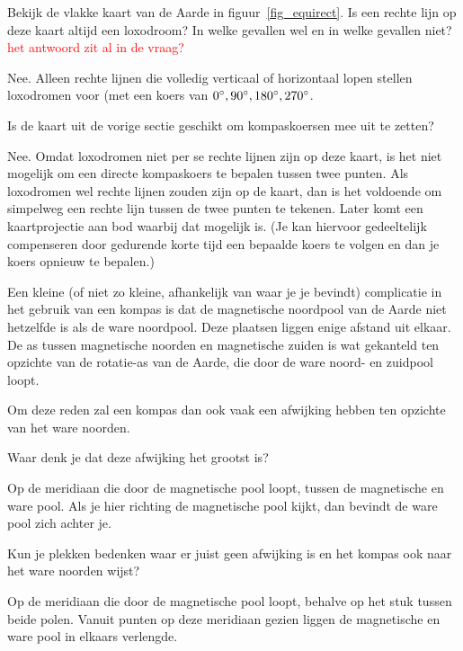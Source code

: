 \begin{opgave}[\ster]
	\begin{subopgave}
		Bekijk de vlakke kaart van de Aarde in figuur~\ref{fig_equirect}. Is een rechte lijn op deze kaart altijd een loxodroom? In welke gevallen wel en in welke gevallen niet? \textcolor{red}{het antwoord zit al in de vraag?}
		\begin{antwoord}
			Nee. Alleen rechte lijnen die volledig verticaal of horizontaal lopen stellen loxodromen voor (met een koers van $0\degree, 90\degree, 180\degree, 270\degree$. 
		\end{antwoord}
	\end{subopgave}
	\begin{subopgave}
		Is de kaart uit de vorige sectie geschikt om kompaskoersen mee uit te zetten?
		\begin{antwoord}
			Nee. Omdat loxodromen niet per se rechte lijnen zijn op deze kaart, is het niet mogelijk om een directe kompaskoers te bepalen tussen twee punten. Als loxodromen wel rechte lijnen zouden zijn op de kaart, dan is het voldoende om simpelweg een rechte lijn tussen de twee punten te tekenen. Later komt een kaartprojectie aan bod waarbij dat mogelijk is. (Je kan hiervoor gedeeltelijk compenseren door gedurende korte tijd een bepaalde koers te volgen en dan je koers opnieuw te bepalen.)
		\end{antwoord}
	\end{subopgave}
\end{opgave}
	
Een kleine (of niet zo kleine, afhankelijk van waar je je bevindt) complicatie in het gebruik van een kompas is dat de magnetische noordpool van de Aarde niet hetzelfde is als de ware noordpool. Deze plaatsen liggen enige afstand uit elkaar. De as tussen magnetische noorden en magnetische zuiden is wat gekanteld ten opzichte van de rotatie-as van de Aarde, die door de ware noord- en zuidpool loopt.

Om deze reden zal een kompas dan ook vaak een afwijking hebben ten opzichte van het ware noorden.

\begin{opgave}
	\begin{subopgave}
		Waar denk je dat deze afwijking het grootst is?
		\begin{antwoord}
			Op de meridiaan die door de magnetische pool loopt, tussen de magnetische en ware pool. Als je hier richting de magnetische pool kijkt, dan bevindt de ware pool zich achter je.
		\end{antwoord}
	\end{subopgave}
	\begin{subopgave}
		Kun je plekken bedenken waar er juist geen afwijking is en het kompas ook naar het ware noorden wijst?
		\begin{antwoord}
			Op de meridiaan die door de magnetische pool loopt, behalve op het stuk tussen beide polen. Vanuit punten op deze meridiaan gezien liggen de magnetische en ware pool in elkaars verlengde.
		\end{antwoord}
	\end{subopgave}	
\end{opgave}

